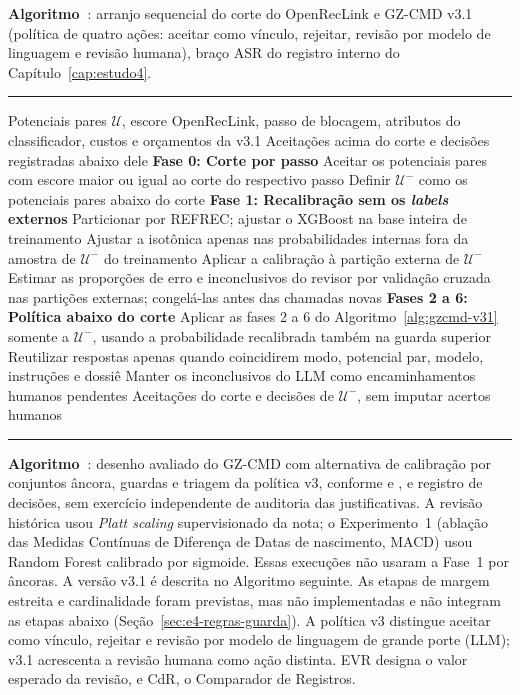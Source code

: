 \label{apendice:gzcmd}

%
\noindent\textbf{Algoritmo~\thealgorithm}: arranjo sequencial do corte do OpenRecLink e GZ-CMD v3.1 (política de quatro ações: aceitar como vínculo, rejeitar, revisão por modelo de linguagem e revisão humana), braço ASR do registro interno do Capítulo~\ref{cap:estudo4}.
\label{alg:gzcmd-arranjo}

\noindent\rule{\textwidth}{0.4pt}
\begin{algorithmic}[1]
\REQUIRE Potenciais pares $\mathcal{U}$, escore OpenRecLink, passo de blocagem, atributos do classificador, custos e orçamentos da v3.1
\ENSURE Aceitações acima do corte e decisões registradas abaixo dele
\STATE \textbf{Fase 0: Corte por passo}
\STATE Aceitar os potenciais pares com escore maior ou igual ao corte do respectivo passo
\STATE Definir $\mathcal{U}^{-}$ como os potenciais pares abaixo do corte
\STATE \textbf{Fase 1: Recalibração sem os \textit{labels} externos}
\STATE Particionar por REFREC; ajustar o XGBoost na base inteira de treinamento
\STATE Ajustar a isotônica apenas nas probabilidades internas fora da amostra de $\mathcal{U}^{-}$ do treinamento
\STATE Aplicar a calibração à partição externa de $\mathcal{U}^{-}$
\STATE Estimar as proporções de erro e inconclusivos do revisor por validação cruzada nas partições externas; congelá-las antes das chamadas novas
\STATE \textbf{Fases 2 a 6: Política abaixo do corte}
\STATE Aplicar as fases 2 a 6 do Algoritmo~\ref{alg:gzcmd-v31} somente a $\mathcal{U}^{-}$, usando a probabilidade recalibrada também na guarda superior
\STATE Reutilizar respostas apenas quando coincidirem modo, potencial par, modelo, instruções e dossiê
\STATE Manter os inconclusivos do LLM como encaminhamentos humanos pendentes
\RETURN Aceitações do corte e decisões de $\mathcal{U}^{-}$, sem imputar acertos humanos
\end{algorithmic}
\noindent\rule{\textwidth}{0.4pt}
\bigskip

%
\noindent\textbf{Algoritmo~\thealgorithm}: desenho avaliado do GZ-CMD com alternativa de calibração por conjuntos âncora, guardas e triagem da política v3, conforme  e , e registro de decisões, sem exercício independente de auditoria das justificativas. A revisão histórica usou \textit{Platt scaling} supervisionado da nota; o Experimento~1 (ablação das Medidas Contínuas de Diferença de Datas de nascimento, MACD) usou Random Forest calibrado por sigmoide. Essas execuções não usaram a Fase~1 por âncoras. A versão v3.1 é descrita no Algoritmo seguinte. As etapas de margem estreita e cardinalidade foram previstas, mas não implementadas e não integram as etapas abaixo (Seção~\ref{sec:e4-regras-guarda}).
\label{alg:gzcmd-pipeline}
A política v3 distingue aceitar como vínculo, rejeitar e revisão por modelo de linguagem de grande porte (LLM); v3.1 acrescenta a revisão humana como ação distinta. EVR designa o valor esperado da revisão, e CdR, o Comparador de Registros.

